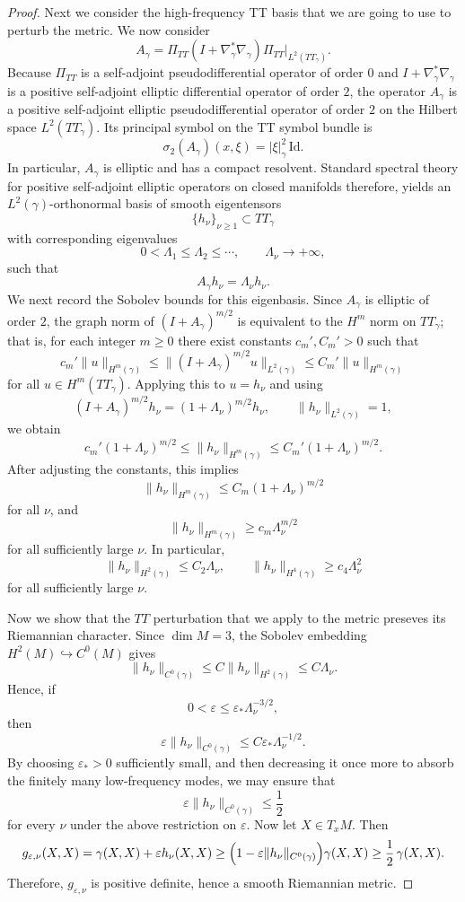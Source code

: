 \documentclass{amsart}
\begin{document}
\begin{proof}
\smallskip
\noindent
Next we consider the high-frequency TT basis that we are going to use to perturb the metric.
We now consider
\[
A_\gamma
=
\Pi_{TT}(I+\nabla_\gamma^{*}\nabla_\gamma)\Pi_{TT}\big|_{L^2(TT_\gamma)}.
\]
Because $\Pi_{TT}$ is a self-adjoint pseudodifferential operator of order $0$ and $I+\nabla_\gamma^*\nabla_\gamma$ is a positive self-adjoint elliptic differential operator of order $2$, the operator $A_\gamma$ is a positive self-adjoint elliptic pseudodifferential operator of order $2$ on the Hilbert space $L^2(TT_\gamma)$. Its principal symbol on the TT symbol bundle is
\[
\sigma_2(A_\gamma)(x,\xi)
=
|\xi|_\gamma^2\,\text{Id} .
\]
In particular, $A_\gamma$ is elliptic and has a compact resolvent. Standard spectral theory for positive self-adjoint elliptic operators on closed manifolds therefore, yields an $L^2(\gamma)$-orthonormal basis of smooth eigentensors
\[
\{h_\nu\}_{\nu\ge1}\subset TT_\gamma
\]
with corresponding eigenvalues
\[
0<\Lambda_1\le\Lambda_2\le\cdots,\qquad \Lambda_\nu\to+\infty,
\]
such that
\[
A_\gamma h_\nu=\Lambda_\nu h_\nu.
\]
 We next record the Sobolev bounds for this eigenbasis. Since $A_\gamma$ is elliptic of order $2$, the graph norm of $(I+A_\gamma)^{m/2}$ is equivalent to the $H^m$ norm on $TT_\gamma$; that is, for each integer $m\ge0$ there exist constants $c_m',C_m'>0$ such that
\[
c_m'\|u\|_{H^m(\gamma)}
\le
\|(I+A_\gamma)^{m/2}u\|_{L^2(\gamma)}
\le
C_m'\|u\|_{H^m(\gamma)}
\]
for all $u\in H^m(TT_\gamma)$. Applying this to $u=h_\nu$ and using
\[
(I+A_\gamma)^{m/2}h_\nu=(1+\Lambda_\nu)^{m/2}h_\nu,
\qquad
\|h_\nu\|_{L^2(\gamma)}=1,
\]
we obtain
\[
c_m'(1+\Lambda_\nu)^{m/2}
\le
\|h_\nu\|_{H^m(\gamma)}
\le
C_m'(1+\Lambda_\nu)^{m/2}.
\]
After adjusting the constants, this implies
\[
\|h_\nu\|_{H^m(\gamma)}
\le C_m(1+\Lambda_\nu)^{m/2}
\]
for all $\nu$, and
\[
\|h_\nu\|_{H^m(\gamma)}
\ge c_m\Lambda_\nu^{m/2}
\]
for all sufficiently large $\nu$.
\noindent In particular,
\[
\|h_\nu\|_{H^2(\gamma)}\le C_2\Lambda_\nu,
\qquad
\|h_\nu\|_{H^4(\gamma)}\ge c_4\Lambda_\nu^2
\]
for all sufficiently large $\nu$.

\smallskip
\noindent
Now we show that the $TT$ perturbation that we apply to the metric preseves its Riemannian character. 
Since $\dim M=3$, the Sobolev embedding $H^{2}(M)\hookrightarrow C^0(M)$ gives
\[
\|h_\nu\|_{C^0(\gamma)}
\le
C\|h_\nu\|_{H^2(\gamma)}
\le
C\Lambda_\nu.
\]
Hence, if
\[
0<\varepsilon\le \varepsilon_*\Lambda_\nu^{-3/2},
\]
then
\[
\varepsilon\|h_\nu\|_{C^0(\gamma)}
\le
C\varepsilon_*\Lambda_\nu^{-1/2}.
\]
By choosing $\varepsilon_*>0$ sufficiently small, and then decreasing it once more to absorb the finitely many low-frequency modes, we may ensure that
\[
\varepsilon\|h_\nu\|_{C^0(\gamma)}\le \frac12
\]
for every $\nu$ under the above restriction on $\varepsilon$. Now let $X\in T_xM$. Then
\[
g_{\varepsilon,\nu}(X,X)
=
\gamma(X,X)+\varepsilon h_\nu(X,X)
\ge
\Bigl(1-\varepsilon\|h_\nu\|_{C^0(\gamma)}\Bigr)\gamma(X,X)
\ge
\frac12\,\gamma(X,X).
\]
Therefore, $g_{\varepsilon,\nu}$ is positive definite, hence a smooth Riemannian metric.


\end{proof}
\end{document}
